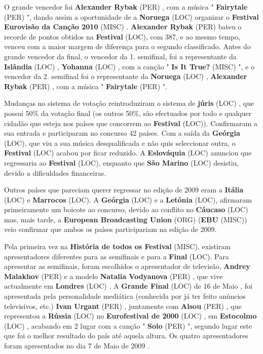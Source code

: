 \documentclass[12pt,a4paper]{article}
\begin{document}
O grande vencedor foi \textbf{Alexander Rybak} (PER) , com a música " \textbf{Fairytale} (PER) ", dando assim a oportunidade de a \textbf{Noruega} (LOC) organizar o \textbf{Festival Eurovisão da Canção 2010} (MISC) . \textbf{Alexander Rybak} (PER) bateu o recorde de pontos obtidos na \textbf{Festival} (LOC), com 387, e ao mesmo tempo, venceu com a maior margem de diferença para o segundo classificado. Antes do grande vencedor da final, o vencedor da 1. semifinal, foi a representante da \textbf{Islândia} (LOC) , \textbf{Yohanna} (LOC) , com a canção " \textbf{Is It True?} (MISC) ", e o vencedor da 2. semifinal foi o representante da \textbf{Noruega} (LOC) , \textbf{Alexander Rybak} (PER) , com a música " \textbf{Fairytale} (PER) ".

Mudanças no sistema de votação reintroduziram o sistema de \textbf{júris} (LOC) , que possui 50\% da votação final (os outros 50\%, são efectuados por todo e qualquer cidadão que esteja nos países que concorrem ao \textbf{Festival} (LOC)). Confirmaram a sua entrada e participaram no concurso 42 países. Com a saída da \textbf{Geórgia} (LOC), que viu a sua música desqualificada e não quis seleccionar outra, o \textbf{Festival} (LOC) acabou por ficar reduzido. A \textbf{Eslováquia} (LOC) anunciou que regressaria ao \textbf{Festival} (LOC), enquanto que \textbf{São Marino} (LOC) desistiu, devido a dificuldades financeiras.

Outros países que pareciam querer regressar no edição de 2009 eram a \textbf{Itália} (LOC) e \textbf{Marrocos} (LOC). A \textbf{Geórgia} (LOC) e a \textbf{Letónia} (LOC), afirmaram primeiramente um boicote ao concurso, devido ao conflito no \textbf{Cáucaso} (LOC) mas, mais tarde, a \textbf{European Broadcasting Union} (ORG) (\textbf{EBU} (MISC)) veio confirmar que ambos os países participariam na edição de 2009.

Pela primeira vez na \textbf{História de todos os Festival} (MISC), existiram apresentadores diferentes para as semifinais e para a \textbf{Final} (LOC). Para apresentar as semifinais, foram escolhidos o apresentador de televisão, \textbf{Andrey Malakhov} (PER) e a modelo \textbf{Natalia Vodyanova} (PER) , que vive actualmente em \textbf{Londres} (LOC) . A \textbf{Grande Final} (LOC) de 16 de Maio , foi apresentada pela personalidade mediática (conhecida por já ter feito anúncios televisivos, etc.) \textbf{Ivan Urgant} (PER) , juntamente com \textbf{Alsou} (PER) , que representou a \textbf{Rússia} (LOC) no \textbf{Eurofestival de 2000} (LOC) , em \textbf{Estocolmo} (LOC) , acabando em 2 lugar com a canção " \textbf{Solo} (PER) ", segundo lugar este que foi o melhor resultado do país até aquela altura. Os quatro apresentadores foram apresentados no dia 7 de Maio de 2009 .
\end{document}

